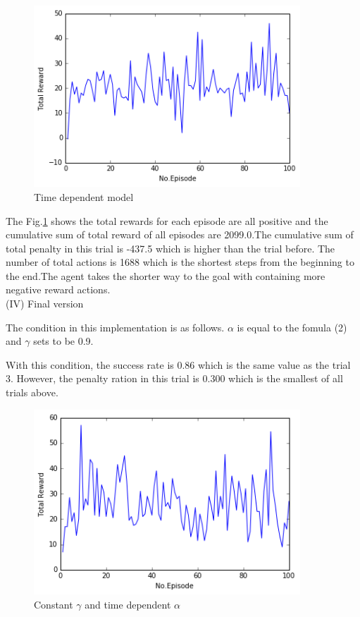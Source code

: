 \documentclass[a4paper,11pt]{article}
\begin{document}
\begin{figure}[H]
\begin{center}
\includegraphics[width=100mm]{graph/better.jpg}
\end{center}
\caption{Time dependent model}
\label{fig:three}
\end{figure}

The Fig.\ref{fig:three} shows the total rewards for each episode are all positive and the cumulative sum of total reward of all episodes are 2099.0.The cumulative sum of total penalty in this trial is -437.5 which is higher than the trial before. The number of total actions is 1688 which is the shortest steps from the beginning to the end.The agent takes the shorter way to the goal with containing more negative reward actions.
\\

(I\hspace{-.1em}V) Final version

The condition in this implementation is as follows.
$\alpha$ is equal to the fomula (2) and $\gamma$ sets to be 0.9.

With this condition, the success rate is 0.86 which is the same value as the trial 3. However, the penalty ration in this trial is 0.300 which is the smallest of all trials above.

\begin{figure}[H]
\begin{center}
\includegraphics[width=100mm]{graph/gamma_con.jpg}
\end{center}
\caption{ Constant $\gamma$ and time dependent $\alpha$}
\label{fig:four}
\end{figure}
\end{document}
